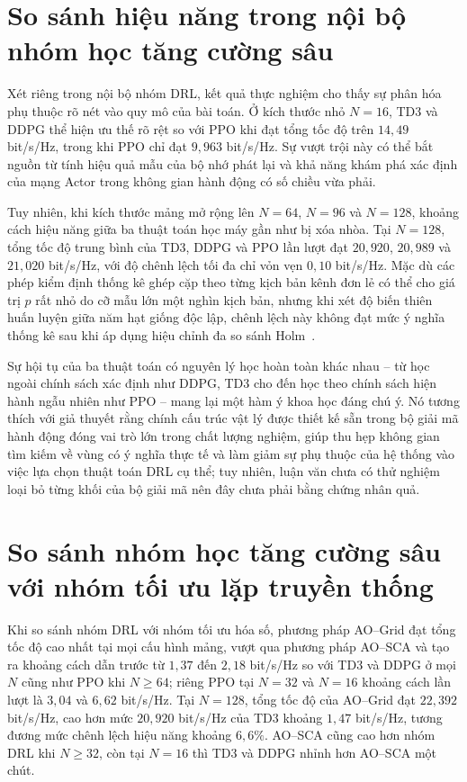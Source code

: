\section{So sánh hiệu năng trong nội bộ nhóm học tăng cường sâu}
\label{sec:so-sanh-drl}

Xét riêng trong nội bộ nhóm DRL, kết quả thực nghiệm cho thấy sự phân hóa phụ thuộc rõ nét vào quy mô của bài
toán. Ở kích thước nhỏ $N = 16$, TD3 và DDPG thể hiện ưu thế rõ rệt so với PPO khi đạt tổng tốc độ trên $14,49$
bit/s/Hz, trong khi PPO chỉ đạt $9,963$ bit/s/Hz. Sự vượt trội này có thể bắt nguồn từ tính hiệu quả mẫu của bộ nhớ
phát lại và khả năng khám phá xác định của mạng Actor trong không gian hành động có số chiều vừa phải.

Tuy nhiên, khi kích thước mảng mở rộng lên $N = 64$, $N = 96$ và $N = 128$, khoảng cách hiệu năng giữa ba thuật
toán học máy gần như bị xóa nhòa. Tại $N = 128$, tổng tốc độ trung bình của TD3, DDPG và PPO lần lượt đạt
$20,920$, $20,989$ và $21,020$ bit/s/Hz, với độ chênh lệch tối đa chỉ vỏn vẹn $0,10$ bit/s/Hz. Mặc dù các phép kiểm
định thống kê ghép cặp theo từng kịch bản kênh đơn lẻ có thể cho giá trị $p$ rất nhỏ do cỡ mẫu lớn một nghìn kịch
bản, nhưng khi xét độ biến thiên huấn luyện giữa năm hạt giống độc lập, chênh lệch này không đạt mức ý nghĩa thống
kê sau khi áp dụng hiệu chỉnh đa so sánh Holm~\cite{Holm1979}.

Sự hội tụ của ba thuật toán có nguyên lý học hoàn toàn khác nhau -- từ học ngoài chính sách xác định như DDPG, TD3
cho đến học theo chính sách hiện hành ngẫu nhiên như PPO -- mang lại một hàm ý khoa học đáng chú ý. Nó tương thích
với giả thuyết rằng chính cấu trúc vật lý được thiết kế sẵn trong bộ giải mã hành động đóng vai trò lớn trong chất
lượng nghiệm, giúp thu hẹp không gian tìm kiếm về vùng có ý nghĩa thực tế và làm giảm sự phụ thuộc của hệ thống vào
việc lựa chọn thuật toán DRL cụ thể; tuy nhiên, luận văn chưa có thử nghiệm loại bỏ từng khối của bộ giải mã nên
đây chưa phải bằng chứng nhân quả.

\section{So sánh nhóm học tăng cường sâu với nhóm tối ưu lặp truyền thống}
\label{sec:so-sanh-drl-ao}

Khi so sánh nhóm DRL với nhóm tối ưu hóa số, phương pháp AO--Grid đạt tổng tốc độ cao nhất tại mọi cấu hình mảng,
vượt qua phương pháp AO--SCA và tạo ra khoảng cách dẫn trước từ $1,37$ đến $2,18$ bit/s/Hz so với TD3 và DDPG ở mọi
$N$ cũng như PPO khi $N \ge 64$; riêng PPO tại $N = 32$ và $N = 16$ khoảng cách lần lượt là $3,04$ và $6,62$
bit/s/Hz. Tại $N = 128$, tổng tốc độ của AO--Grid đạt $22,392$ bit/s/Hz, cao hơn mức $20,920$ bit/s/Hz của TD3
khoảng $1,47$ bit/s/Hz, tương đương mức chênh lệch hiệu năng khoảng $6,6\%$. AO--SCA cũng cao hơn nhóm DRL khi
$N \ge 32$, còn tại $N = 16$ thì TD3 và DDPG nhỉnh hơn AO--SCA một chút.

